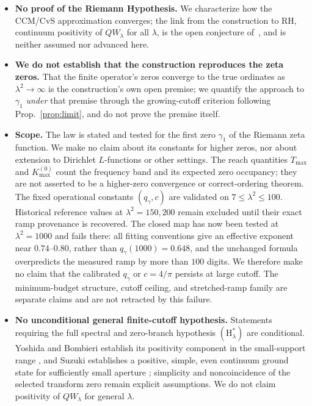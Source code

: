 \documentclass[11pt,a4paper]{article}
\begin{document}
\begin{itemize}
\item \textbf{No proof of the Riemann Hypothesis.} We characterize how the
  CCM/CvS approximation converges; the link from the construction to RH,
  continuum positivity of $QW_\lambda$ for all $\lambda$, is the open
  conjecture of~\cite{CCM2025,CvS2025,Connes2026}, and is neither assumed nor
  advanced here.
\item \textbf{We do not establish that the construction reproduces the zeta
  zeros.} That the finite operator's zeros converge to the true ordinates as
  $\lambda^2\to\infty$ is the construction's own open premise; we quantify the
  approach to $\gamma_1$ \emph{under} that premise through the growing-cutoff
  criterion following Prop.~\ref{prop:limit}, and do not prove the premise
  itself.
\item \textbf{Scope.} The law is stated and tested for the first zero $\gamma_1$
  of the Riemann zeta function. We make no claim about its constants for higher
  zeros, nor about extension to Dirichlet $L$-functions or other settings. The
  reach quantities $T_{\max}$ and $K_{\max}^{(0)}$ count the frequency band and
  its expected zero occupancy; they are not asserted to be a higher-zero
  convergence or correct-ordering theorem.
  The fixed operational constants $(q_\gamma,c)$ are validated on
  $7\le\lambda^2\le100$. Historical reference values at
  $\lambda^2=150,200$ remain excluded until their exact ramp provenance is
  recovered. The closed map has now been tested at $\lambda^2=1000$ and fails
  there: all fitting conventions give an effective exponent near
  $0.74$--$0.80$, rather than $q_\gamma(1000)=0.648$, and the unchanged formula
  overpredicts the measured ramp by more than $100$ digits. We therefore make
  no claim that the calibrated $q_\gamma$ or $c=4/\pi$ persists at large
  cutoff. The minimum-budget structure, cutoff ceiling, and stretched-ramp
  family are separate claims and are not retracted by this failure.
\item \textbf{No unconditional general finite-cutoff hypothesis.} Statements
  requiring the full spectral and zero-branch hypothesis
  $(\mathrm{H}_\lambda^\ast)$ are conditional. Yoshida and Bombieri establish
  its positivity component in the small-support range
  \cite{Yoshida1992,Bombieri2000}, and Suzuki establishes a positive, simple,
  even continuum ground state for sufficiently small aperture
  \cite[Thm.~1.4]{Suzuki2026}; simplicity and noncoincidence of the selected
  transform zero remain explicit assumptions. We do not claim positivity of
  $QW_\lambda$ for general $\lambda$.
\end{itemize}
\end{document}
